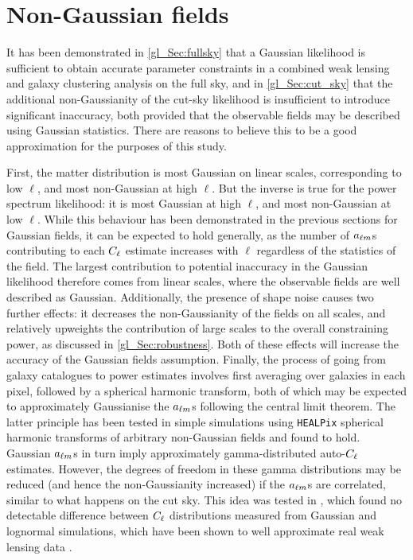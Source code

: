 \section{Non-Gaussian fields}
\label{gl_Sec:nongauss_fields}

It has been demonstrated in \autoref{gl_Sec:fullsky} that a Gaussian likelihood is sufficient to obtain accurate parameter constraints in a combined weak lensing and galaxy clustering analysis on the full sky, and in \autoref{gl_Sec:cut_sky} that the additional non-Gaussianity of the cut-sky likelihood is insufficient to introduce significant inaccuracy, both provided that the observable fields may be described using Gaussian statistics. There are reasons to believe this to be a good approximation for the purposes of this study.

First, the matter distribution is most Gaussian on linear scales, corresponding to low $\ell$, and most non-Gaussian at high $\ell$. But the inverse is true for the power spectrum likelihood: it is most Gaussian at high $\ell$, and most non-Gaussian at low $\ell$. While this behaviour has been demonstrated in the previous sections for Gaussian fields, it can be expected to hold generally, as the number of $a_{\ell m}$s contributing to each $C_\ell$ estimate increases with $\ell$ regardless of the statistics of the field.
The largest contribution to potential inaccuracy in the Gaussian likelihood therefore comes from linear scales, where the observable fields are well described as Gaussian.
Additionally, the presence of shape noise causes two further effects: it decreases the non-Gaussianity of the fields on all scales, and relatively upweights the contribution of large scales to the overall constraining power, as discussed in \autoref{gl_Sec:robustness}. Both of these effects will increase the accuracy of the Gaussian fields assumption.
Finally, the process of going from galaxy catalogues to power estimates involves first averaging over galaxies in each pixel, followed by a spherical harmonic transform, both of which may be expected to approximately Gaussianise the $a_{\ell m}$s following the central limit theorem.
The latter principle has been tested in simple simulations using \texttt{HEALPix} spherical harmonic transforms of arbitrary non-Gaussian fields and found to hold. Gaussian $a_{\ell m}$s in turn imply approximately gamma-distributed auto-$C_\ell$ estimates. However, the degrees of freedom in these gamma distributions may be reduced (and hence the non-Gaussianity increased) if the $a_{\ell m}$s are correlated, similar to what happens on the cut sky. This idea was tested in \citet{Taylor2019}, which found no detectable difference between $C_\ell$ distributions measured from Gaussian and lognormal simulations, which have been shown to well approximate real weak lensing data \citep{Taruya2002, Hilbert2011, Clerkin2016}.

